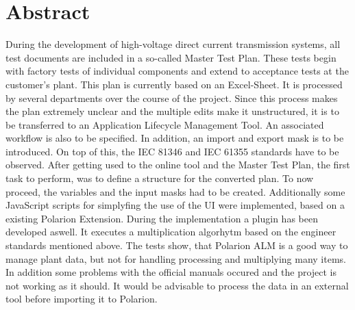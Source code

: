 \chapter*{Abstract}
\thispagestyle{empty}
%
During the development of high-voltage direct current transmission systems, all test documents are included in a so-called Master Test Plan. These tests begin with factory tests of individual components and extend to acceptance tests at the customer's plant. This plan is currently based on an Excel-Sheet. It is processed by several departments over the course of the project. Since this process makes the plan extremely unclear and the multiple edits make it unstructured, it is to be transferred to an Application Lifecycle Management Tool. An associated workflow is also to be specified. In addition, an import and export mask is to be introduced. On top of this, the IEC 81346 and IEC 61355 standards have to be observed. After getting used to the online tool and the Master Test Plan, the first task to perform, was to define a structure for the converted plan. To now proceed, the variables and the input masks had to be created. Additionally some JavaScript scripts for simplyfing the use of the UI were implemented, based on a existing Polarion Extension. During the implementation a plugin has been developed aswell. It executes a multiplication algorhytm based on the engineer standards mentioned above. 
The tests show, that Polarion ALM is a good way to manage plant data, but not for handling processing and multiplying many items. In addition some problems with the official manuals occured and the project is not working as it should. It would be advisable to process the data in an external tool before importing it to Polarion.
%

\newpage

